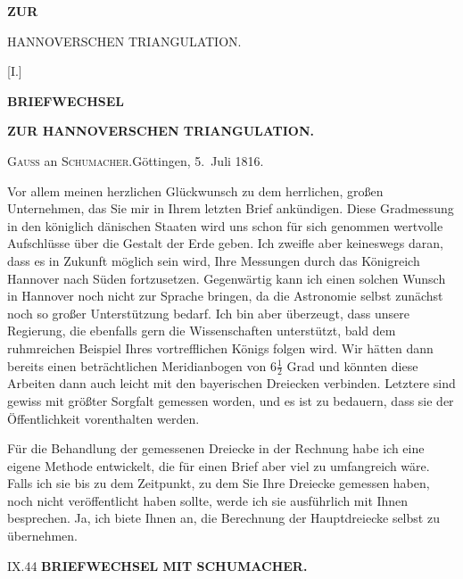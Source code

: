 \vspace*{40mm}
\begin{center}
{\Large\bfseries ZUR\par\medskip HANNOVERSCHEN TRIANGULATION.}
\end{center}
\clearpage\null\clearpage
\begin{center}
[I.]\par\medskip
{\Large\bfseries BRIEFWECHSEL}\par\medskip
{\bfseries ZUR HANNOVERSCHEN TRIANGULATION.}\par\bigskip
[1.]\par\medskip
\textsc{Gauss} an \textsc{Schumacher}.\quad Göttingen, 5.~Juli 1816.
\end{center}

\par\noindent\hspace*{\parindent}Vor allem meinen herzlichen Glückwunsch zu dem herrlichen, großen Unternehmen, das Sie mir in Ihrem letzten Brief ankündigen. Diese Gradmessung in den königlich dänischen Staaten wird uns schon für sich genommen wertvolle Aufschlüsse über die Gestalt der Erde geben. Ich zweifle aber keineswegs daran, dass es in Zukunft möglich sein wird, Ihre Messungen durch das Königreich Hannover nach Süden fortzusetzen. Gegenwärtig kann ich einen solchen Wunsch in Hannover noch nicht zur Sprache bringen, da die Astronomie selbst zunächst noch so großer Unterstützung bedarf. Ich bin aber überzeugt, dass unsere Regierung, die ebenfalls gern die Wissenschaften unterstützt, bald dem ruhmreichen Beispiel Ihres vortrefflichen Königs folgen wird. Wir hätten dann bereits einen beträchtlichen Meridianbogen von \(6\frac{1}{2}\) Grad und könnten diese Arbeiten dann auch leicht mit den bayerischen Dreiecken verbinden. Letztere sind gewiss mit größter Sorgfalt gemessen worden, und es ist zu bedauern, dass sie der Öffentlichkeit vorenthalten werden.

\par\noindent\hspace*{\parindent}Für die Behandlung der gemessenen Dreiecke in der Rechnung habe ich eine eigene Methode entwickelt, die für einen Brief aber viel zu umfangreich wäre. Falls ich sie bis zu dem Zeitpunkt, zu dem Sie Ihre Dreiecke gemessen haben, noch nicht veröffentlicht haben sollte, werde ich sie ausführlich mit Ihnen besprechen. Ja, ich biete Ihnen an, die Berechnung der Hauptdreiecke selbst zu übernehmen.
\par\medskip\noindent IX.\hfill44
\clearpage
{}\hfill{\small\textbf{BRIEFWECHSEL MIT SCHUMACHER.}}\par\medskip

